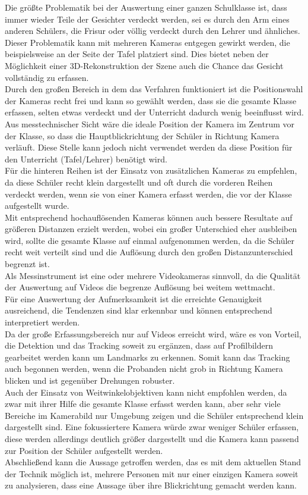 Die größte Problematik bei der Auswertung einer ganzen Schulklasse ist, dass immer wieder Teile der Gesichter verdeckt werden, sei es durch den Arm eines anderen Schülers, die Frisur oder völlig verdeckt durch den Lehrer und ähnliches.\\
Dieser Problematik kann mit mehreren Kameras entgegen gewirkt werden, die beispielsweise an der Seite der Tafel platziert sind. Dies bietet neben der Möglichkeit einer 3D-Rekonstruktion der Szene auch die Chance das Gesicht vollständig zu erfassen.\\
Durch den großen Bereich in dem das Verfahren funktioniert ist die Positionswahl der Kameras recht frei und kann so gewählt werden, dass sie die gesamte Klasse erfassen, selten etwas verdeckt und der Unterricht dadurch wenig beeinflusst wird. Aus messtechnischer Sicht wäre die ideale Position der Kamera im Zentrum vor der Klasse, so dass die Hauptblickrichtung der Schüler in Richtung Kamera verläuft. Diese Stelle kann jedoch nicht verwendet werden da diese Position für den Unterricht (Tafel/Lehrer) benötigt wird.\\
Für die hinteren Reihen ist der Einsatz von zusätzlichen Kameras zu empfehlen, da diese Schüler recht klein dargestellt und oft durch die vorderen Reihen verdeckt werden, wenn sie von einer Kamera erfasst werden, die vor der Klasse aufgestellt wurde.\\
Mit entsprechend hochauflösenden Kameras können auch bessere Resultate auf größeren Distanzen erzielt werden, wobei ein großer Unterschied eher ausbleiben wird, sollte die gesamte Klasse auf einmal aufgenommen werden, da die Schüler recht weit verteilt sind und die Auflösung durch den großen Distanzunterschied begrenzt ist.\\ 
Als Messinstrument ist eine oder mehrere Videokameras sinnvoll, da die Qualität der Auswertung auf Videos die begrenze Auflösung bei weitem wettmacht.\\
Für eine Auswertung der Aufmerksamkeit ist die erreichte Genauigkeit ausreichend, die Tendenzen sind klar erkennbar und können entsprechend interpretiert werden.\\
Da der große Erfassungsbereich nur auf Videos erreicht wird, wäre es von Vorteil, die Detektion und das Tracking soweit zu ergänzen, dass auf Profilbildern gearbeitet werden kann um Landmarks zu erkennen. Somit kann das Tracking auch begonnen werden, wenn die Probanden nicht grob in Richtung Kamera blicken und ist gegenüber Drehungen robuster.\\
Auch der Einsatz von Weitwinkelobjektiven kann nicht empfohlen werden, da zwar mit ihrer Hilfe die gesamte Klasse erfasst werden kann, aber sehr viele Bereiche im Kamerabild nur Umgebung zeigen und die Schüler entsprechend klein dargestellt sind. Eine fokussiertere Kamera würde zwar weniger Schüler erfassen, diese werden allerdings deutlich größer dargestellt und die Kamera kann passend zur Position der Schüler aufgestellt werden.\\
Abschließend kann die Aussage getroffen werden, das es mit dem aktuellen Stand der Technik möglich ist, mehrere Personen mit nur einer einzigen Kamera soweit zu analysieren, dass eine Aussage über ihre Blickrichtung gemacht werden kann.
